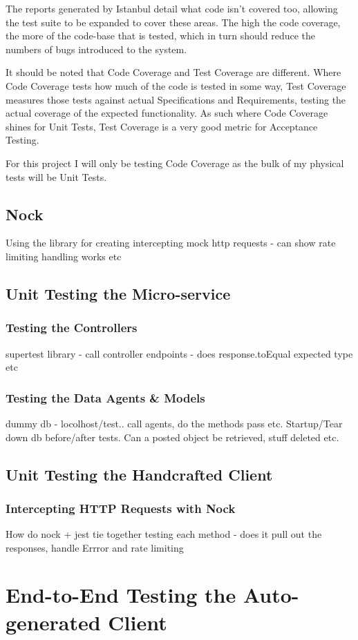 The reports generated by Istanbul detail what code isn't covered too, allowing the test suite to be expanded to cover these areas. The high the code coverage, the more of the code-base that is tested, which in turn should reduce the numbers of bugs introduced to the system.

It should be noted that Code Coverage and Test Coverage are different. Where Code Coverage tests how much of the code is tested in some way, Test Coverage measures those tests against actual Specifications and Requirements, testing the actual coverage of the expected functionality. As such where Code Coverage shines for Unit Tests, Test Coverage is a very good metric for Acceptance Testing.

For this project I will only be testing Code Coverage as the bulk of my physical tests will be Unit Tests.
\subsection{Nock}
Using the library for creating intercepting mock http requests - can show rate limiting handling works etc
\subsection{Unit Testing the Micro-service}
\subsubsection{Testing the Controllers}
supertest library - call controller endpoints - does response.toEqual expected type etc
\subsubsection{Testing the Data Agents \& Models}
dummy db - locolhost/test.. call agents, do the methods pass etc. Startup/Tear down db before/after tests. Can a posted object be retrieved, stuff deleted etc. 
\subsection{Unit Testing the Handcrafted Client}
\subsubsection{Intercepting HTTP Requests with Nock}
How do nock + jest tie together
testing each method - does it pull out the responses, handle Errror and rate limiting
\section{End-to-End Testing the Auto-generated Client}
